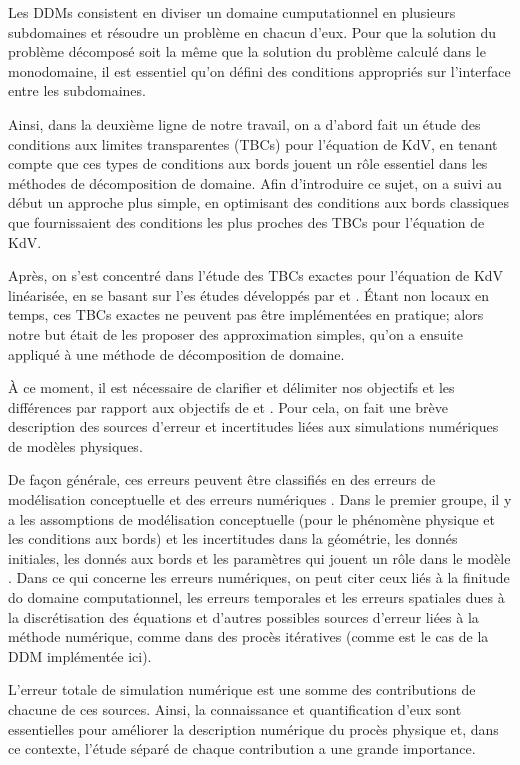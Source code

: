 \indent Les DDMs consistent en diviser un domaine cumputationnel en plusieurs subdomaines et résoudre un problème en chacun d'eux. Pour que la solution du problème décomposé soit la même que la solution du problème calculé dans le monodomaine, il est essentiel qu'on défini des conditions appropriés sur l'interface entre les subdomaines.

\indent Ainsi, dans la deuxième ligne de notre travail, on a d'abord fait un étude des conditions aux limites transparentes (TBCs) pour l'équation de KdV, en tenant compte que ces types de conditions aux bords jouent un rôle essentiel dans les méthodes de décomposition de domaine. Afin d'introduire ce sujet, on a suivi au début un approche plus simple, en optimisant des conditions aux bords classiques que fournissaient des conditions les plus proches des TBCs pour l'équation de KdV.

\indent Après, on s'est concentré dans l'étude des TBCs exactes pour l'équation de KdV linéarisée, en se basant sur l'es études développés par \cite{zheng2008} et \cite{besse2015}. Étant non locaux en temps, ces TBCs exactes ne peuvent pas être implémentées en pratique; alors notre but était de les proposer des approximation simples, qu'on a ensuite appliqué à une méthode de décomposition de domaine.

\indent À ce moment, il est nécessaire de clarifier et délimiter nos objectifs et les différences par rapport aux objectifs de \cite{zheng2008} et \cite{besse2015}. Pour cela, on fait une brève description des sources d'erreur et incertitudes liées aux simulations numériques de modèles physiques.

\indent De façon générale, ces erreurs peuvent être classifiés en des erreurs de modélisation conceptuelle et des erreurs numériques \cite{roache1997}. Dans le premier groupe, il y a les assomptions de modélisation conceptuelle (pour le phénomène physique et les conditions aux bords) et les incertitudes dans la géométrie, les donnés initiales, les donnés aux bords et les paramètres qui jouent un rôle dans le modèle \cite{roache1997,balagurusamy2008}. Dans ce qui concerne les erreurs numériques, on peut citer ceux liés à la finitude do domaine computationnel, les erreurs temporales et les erreurs spatiales dues à la discrétisation des équations\cite{karniadakis1995,roache1997} et d'autres possibles sources d'erreur liées à la méthode numérique, comme dans des procès itératives (comme est le cas de la DDM implémentée ici).

\indent L'erreur totale de simulation numérique est une somme des contributions de chacune de ces sources. Ainsi, la connaissance et quantification d'eux sont essentielles pour améliorer la description numérique du procès physique et, dans ce contexte, l'étude séparé de chaque contribution a une grande importance.

